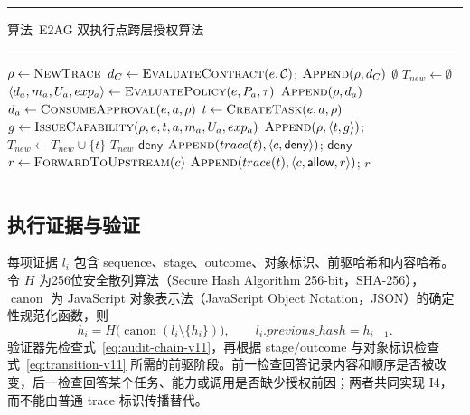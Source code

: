 \par\addvspace{\intextsep}
\noindent\rule{\linewidth}{0.6pt}
\label{alg:e2ag-v11}
{\centering 算法~\thealgorithm\quad E2AG 双执行点跨层授权算法\par}
\vspace{-0.5\baselineskip}
\noindent\rule{\linewidth}{0.4pt}
\begin{algorithmic}[1]
  \State $\rho\gets\Call{NewTrace}{}$
  \State $d_C\gets\Call{EvaluateContract}{e,\mathcal{C}}$; $\Call{Append}{\rho,d_C}$
   \State \Return $\emptyset$ \EndIf
  \State $T_{new}\gets\emptyset$
    \State $\langle d_a,m_a,U_a,exp_a\rangle\gets\Call{EvaluatePolicy}{e,P_a,\tau}$
    \State $\Call{Append}{\rho,d_a}$
      \State $d_a\gets\Call{ConsumeApproval}{e,a,\rho}$
    \EndIf
      \State $t\gets\Call{CreateTask}{e,a,\rho}$
      \State $g\gets\Call{IssueCapability}{\rho,e,t,a,m_a,U_a,exp_a}$
      \State $\Call{Append}{\rho,\langle t,g\rangle}$; $T_{new}\gets T_{new}\cup\{t\}$
    \EndIf
  \EndFor
  \State \Return $T_{new}$
\EndProcedure
{}
   \State \Return $\mathsf{deny}$ \EndIf
    \State $\Call{Append}{trace(t),\langle c,\mathsf{deny}\rangle}$; \Return $\mathsf{deny}$
  \EndIf
  \State $r\gets\Call{ForwardToUpstream}{c}$
  \State $\Call{Append}{trace(t),\langle c,\mathsf{allow},r\rangle}$; \Return $r$
\EndProcedure
\end{algorithmic}
\noindent\rule{\linewidth}{0.6pt}
\par\addvspace{\intextsep}

\subsection{执行证据与验证}

每项证据 $l_i$ 包含 sequence、stage、outcome、对象标识、前驱哈希和内容哈希。令 $H$ 为256位安全散列算法（Secure Hash Algorithm 256-bit，SHA-256），$\operatorname{canon}$ 为 JavaScript 对象表示法（JavaScript Object Notation，JSON）的确定性规范化函数，则
\begin{equation}
h_i=H\bigl(\operatorname{canon}(l_i\setminus\{h_i\})\bigr),\qquad
l_i.previous\_hash=h_{i-1}.
\label{eq:audit-chain-v11}
\end{equation}
验证器先检查式~\eqref{eq:audit-chain-v11}，再根据 stage/outcome 与对象标识检查式~\eqref{eq:transition-v11} 所需的前驱阶段。前一检查回答记录内容和顺序是否被改变，后一检查回答某个任务、能力或调用是否缺少授权前因；两者共同实现 I4，而不能由普通 trace 标识传播替代。

